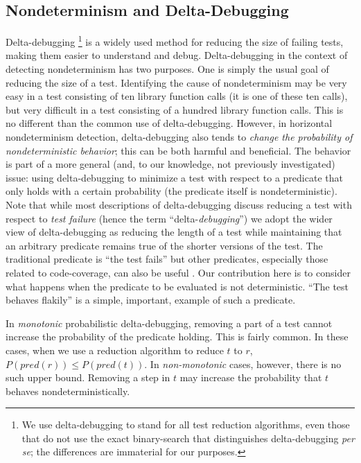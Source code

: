 \subsection{Nondeterminism and Delta-Debugging}

Delta-debugging \cite{DD}\footnote{We use delta-debugging to stand for
  all test reduction algorithms, even those \cite{CReduce,tstl} that do not use the exact
  binary-search that distinguishes delta-debugging \emph{per se}; the
  differences are immaterial for our purposes.}  is a widely used method for reducing the
size of failing tests, making them easier to understand and debug.
Delta-debugging in the context of detecting nondeterminism has two
purposes.  One is simply the usual goal of reducing the size of a
test.  Identifying the cause of nondeterminism may be very easy in a
test consisting of ten library function calls (it is one of these ten
calls), but very difficult in a test consisting of a hundred library
function calls.  This is no different than the common use of
delta-debugging.  However, in horizontal nondeterminism detection,
delta-debugging also tends to \emph{change the probability of
  nondeterministic behavior}; this can be both harmful and
beneficial.  The behavior is part of a more general (and, to our
knowledge, not previously investigated) issue:  using delta-debugging
to minimize a test with respect to a predicate that only holds with a
certain probability (the predicate itself is nondeterministic).  Note
that while most descriptions of delta-debugging discuss reducing a
test with respect to \emph{test failure} (hence the term
``delta-\emph{debugging}'') we adopt the wider view of delta-debugging
as reducing the length of a test while maintaining that an arbitrary
predicate remains true of the shorter versions of the test.  The
traditional predicate is ``the test fails'' but other predicates,
especially those related to code-coverage, can also be useful
\cite{icst2014,stvrcausereduce,NonAdeq}.  Our contribution here is to consider
what happens when the predicate to be evaluated is not deterministic.
``The test behaves flakily'' is a simple, important, example of such a predicate.

In \emph{monotonic} probabilistic delta-debugging, removing a part of a test cannot
increase the probability of the predicate holding.  This is fairly
common.  In these cases, when we use a reduction algorithm to reduce $t$
to $r$, $P(pred(r)) \leq P(pred(t))$.  In \emph{non-monotonic} cases,
however, there is no such upper bound.  Removing a step in $t$ may
increase the probability that $t$ behaves nondeterministically.

